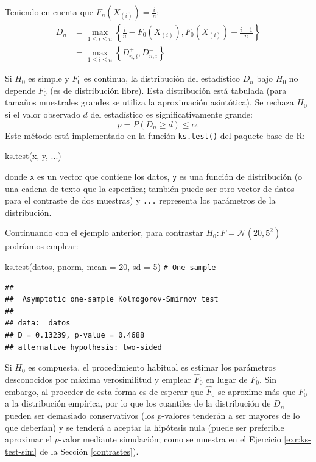 \documentclass[
]{book}
\newenvironment{Shaded}{\begin{snugshade}}{\end{snugshade}}
\newcommand{\AttributeTok}[1]{\textcolor[rgb]{0.77,0.63,0.00}{#1}}
\newcommand{\CommentTok}[1]{\textcolor[rgb]{0.56,0.35,0.01}{\textit{#1}}}
\newcommand{\DecValTok}[1]{\textcolor[rgb]{0.00,0.00,0.81}{#1}}
\newcommand{\FunctionTok}[1]{\textcolor[rgb]{0.00,0.00,0.00}{#1}}
\newcommand{\NormalTok}[1]{#1}
\theoremstyle{break}
\theoremstyle{nonumberplain}
\renewcommand{\CommentTok}[1]{\textcolor[rgb]{0.41,0.41,0.41}{\texttt{#1}}}
\begin{document}
Teniendo en cuenta que \(F_n\left( X_{(i)}\right) = \frac{i}n\):
\[\begin{aligned}
D_n  & =\max_{1\leq i\leq n}\left \{  \frac{i}n-F_0(X_{(i)}),F_0(X_{(i)})-\frac{i-1}n\right \} \\
& =\max_{1\leq i\leq n}\left \{  D_{n,i}^{+},D_{n,i}^{-}\right \}
\end{aligned}\]

Si \(H_0\) es simple y \(F_0\) es continua, la distribución del estadístico \(D_n\) bajo \(H_0\) no depende \(F_0\) (es de distribución libre).
Esta distribución está tabulada (para tamaños muestrales grandes se utiliza la aproximación asintótica).
Se rechaza \(H_0\) si el valor observado \(d\) del estadístico es significativamente grande:
\[p = P \left( D_n \geq d \right) \leq \alpha.\]
Este método está implementado en la función \texttt{ks.test()} del paquete base de R:

\begin{Shaded}
\begin{Highlighting}[]
\FunctionTok{ks.test}\NormalTok{(x, y, ...)}
\end{Highlighting}
\end{Shaded}

donde \texttt{x} es un vector que contiene los datos, \texttt{y} es una función de distribución
(o una cadena de texto que la especifica; también puede ser otro vector de datos
para el contraste de dos muestras) y \texttt{...} representa los parámetros de la distribución.

Continuando con el ejemplo anterior, para contrastar \(H_0:F= \mathcal{N}(20,5^2)\) podríamos emplear:

\begin{Shaded}
\begin{Highlighting}[]
\FunctionTok{ks.test}\NormalTok{(datos, pnorm, }\AttributeTok{mean =} \DecValTok{20}\NormalTok{, }\AttributeTok{sd =} \DecValTok{5}\NormalTok{) }\CommentTok{\# One{-}sample }
\end{Highlighting}
\end{Shaded}

\begin{verbatim}
## 
##  Asymptotic one-sample Kolmogorov-Smirnov test
## 
## data:  datos
## D = 0.13239, p-value = 0.4688
## alternative hypothesis: two-sided
\end{verbatim}

Si \(H_0\) es compuesta, el procedimiento habitual es estimar los parámetros desconocidos
por máxima verosimilitud y emplear \(\hat{F}_0\) en lugar de \(F_0\).
Sin embargo, al proceder de esta forma es de esperar que \(\hat{F}_0\) se aproxime más
que \(F_0\) a la distribución empírica, por lo que los cuantiles de la distribución de
\(D_n\) pueden ser demasiado conservativos (los \(p\)-valores tenderán a ser mayores de
lo que deberían) y se tenderá a aceptar la hipótesis nula (puede ser preferible aproximar el \(p\)-valor mediante simulación; como se muestra en el Ejercicio \ref{exr:ks-test-sim} de la Sección \ref{contrastes}).
\end{document}
